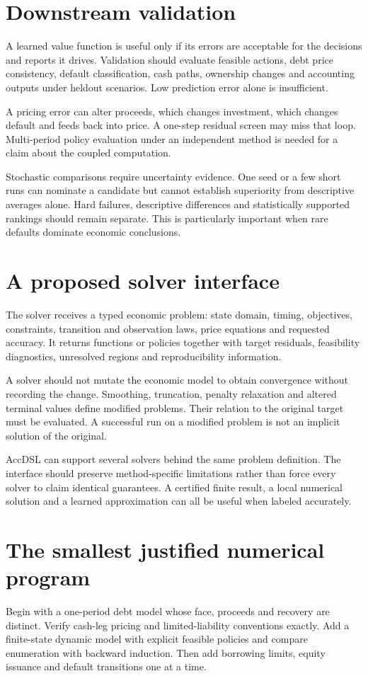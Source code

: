 \section{Downstream validation}
A learned value function is useful only if its errors are acceptable for the decisions and reports it drives. Validation should evaluate feasible actions, debt price consistency, default classification, cash paths, ownership changes and accounting outputs under heldout scenarios. Low prediction error alone is insufficient.

A pricing error can alter proceeds, which changes investment, which changes default and feeds back into price. A one-step residual screen may miss that loop. Multi-period policy evaluation under an independent method is needed for a claim about the coupled computation.

Stochastic comparisons require uncertainty evidence. One seed or a few short runs can nominate a candidate but cannot establish superiority from descriptive averages alone. Hard failures, descriptive differences and statistically supported rankings should remain separate. This is particularly important when rare defaults dominate economic conclusions.

\section{A proposed solver interface}
The solver receives a typed economic problem: state domain, timing, objectives, constraints, transition and observation laws, price equations and requested accuracy. It returns functions or policies together with target residuals, feasibility diagnostics, unresolved regions and reproducibility information.

A solver should not mutate the economic model to obtain convergence without recording the change. Smoothing, truncation, penalty relaxation and altered terminal values define modified problems. Their relation to the original target must be evaluated. A successful run on a modified problem is not an implicit solution of the original.

AccDSL can support several solvers behind the same problem definition. The interface should preserve method-specific limitations rather than force every solver to claim identical guarantees. A certified finite result, a local numerical solution and a learned approximation can all be useful when labeled accurately.

\section{The smallest justified numerical program}
Begin with a one-period debt model whose face, proceeds and recovery are distinct. Verify cash-leg pricing and limited-liability conventions exactly. Add a finite-state dynamic model with explicit feasible policies and compare enumeration with backward induction. Then add borrowing limits, equity issuance and default transitions one at a time.

